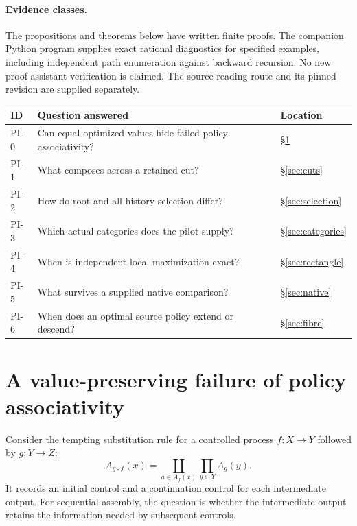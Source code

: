 \documentclass[11pt]{article}
\theoremstyle{definition}
\begin{document}
\paragraph{Evidence classes.}
The propositions and theorems below have written finite proofs. The companion
Python program supplies exact rational diagnostics for specified examples,
including independent path enumeration against backward recursion. No new
proof-assistant verification is claimed. The source-reading route and its
pinned revision are supplied separately.

\begin{center}
\small
\begin{tabularx}{\textwidth}{@{}lXl@{}}
\toprule
ID & Question answered & Location\\
\midrule
PI-0 & Can equal optimized values hide failed policy associativity? & \S\ref{sec:obstruction}\\
PI-1 & What composes across a retained cut? & \S\ref{sec:cuts}\\
PI-2 & How do root and all-history selection differ? & \S\ref{sec:selection}\\
PI-3 & Which actual categories does the pilot supply? & \S\ref{sec:categories}\\
PI-4 & When is independent local maximization exact? & \S\ref{sec:rectangle}\\
PI-5 & What survives a supplied native comparison? & \S\ref{sec:native}\\
PI-6 & When does an optimal source policy extend or descend? & \S\ref{sec:fibre}\\
\bottomrule
\end{tabularx}
\end{center}

\section{A value-preserving failure of policy associativity}
\label{sec:obstruction}
Consider the tempting substitution rule for a controlled process
\(f:X\to Y\) followed by \(g:Y\to Z\):
\begin{equation}
 A_{g\circ f}(x)
   =\coprod_{a\in A_f(x)}\prod_{y\in Y} A_g(y).
 \label{eq:naive}
\end{equation}
It records an initial control and a continuation control for each
intermediate output. For sequential assembly, the question is whether the
intermediate output retains the information needed by subsequent controls.
\end{document}
